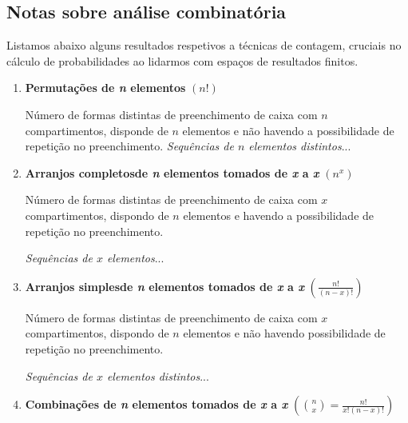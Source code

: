\clearpage
\subsection[1.3 Notas sobre análise combinatória]{\hspace*{0.075 em}\raisebox{0.2 em}{$\pmb{\drsh}$} Notas sobre análise combinatória}
\label{subsec:combinatorics}

Listamos abaixo alguns resultados respetivos a técnicas de contagem, cruciais no cálculo de probabilidades ao lidarmos com espaços de resultados finitos.

\begin{enumerate}[label=$\bullet$]
    \item \textbf{Permutações de \textit{n} elementos} \hfill $(n!)$
    
    \noindent Número de formas distintas de preenchimento de caixa com $n$ compartimentos, disponde de $n$ elementos e não havendo a possibilidade de repetição no preenchimento. \hfill {\small \textit{Sequências de $n$ elementos distintos}...}
    
    \item \textbf{Arranjos completos\footnotemark[5] de \textit{n} elementos tomados de \textit{x} a \textit{x}} \hfill $(n^x)$

    \noindent Número de formas distintas de preenchimento de caixa com $x$ compartimentos, dispondo de $n$ elementos e havendo a possibilidade de repetição no preenchimento.

    \vspace{-0.425em}
    \hfill {\small \textit{Sequências de $x$ elementos}...}
    
    \item \textbf{Arranjos simples\footnotemark[6] de \textit{n} elementos tomados de \textit{x} a \textit{x}} \hfill $\left(\frac{n!}{(n-x)!}\right)$

    \noindent Número de formas distintas de preenchimento de caixa com $x$ compartimentos, dispondo de $n$ elementos e não havendo possibilidade de repetição no preenchimento.

    \vspace{-0.425em}
    \hfill {\small \textit{Sequências de $x$ elementos distintos}...}
    
    \item \textbf{Combinações de \textit{n} elementos tomados de \textit{x} a \textit{x}} \hfill $\left(\binom{n}{x} = \frac{n!}{x!(n-x)!}\right)$


\end{enumerate}
